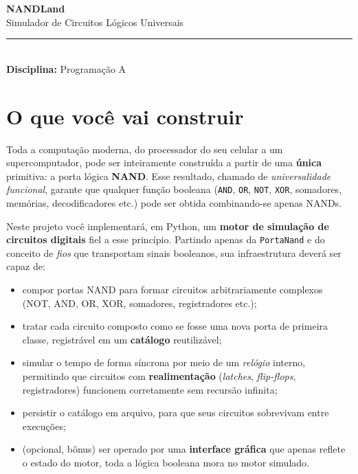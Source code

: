 \documentclass[11pt,a4paper]{article}
\begin{document}
\begin{tcolorbox}[
  enhanced, colback=nandblue!85!black, colframe=nandblue!85!black,
  arc=4pt, boxrule=0pt, left=14pt, right=14pt, top=12pt, bottom=12pt
]
\begin{center}
  {\LARGE\bfseries\color{white} NANDLand}\\[3pt]
  {\large\color{white!90} Simulador de Circuitos Lógicos Universais}\\[6pt]
  {\color{nandaccent!30}\rule{0.4\textwidth}{0.6pt}}\\[4pt]
  {\small\color{white!85}\textbf{Disciplina:} Programação A}
\end{center}
\end{tcolorbox}

\vspace{0.4cm}

\section*{O que você vai construir}

Toda a computação moderna, do processador do seu celular a um supercomputador, pode ser inteiramente construída a partir de uma \textbf{única} primitiva: a porta lógica \textbf{NAND}. Esse resultado, chamado de \emph{universalidade funcional}, garante que qualquer função booleana (\texttt{AND}, \texttt{OR}, \texttt{NOT}, \texttt{XOR}, somadores, memórias, decodificadores etc.) pode ser obtida combinando-se apenas NANDs.

Neste projeto você implementará, em Python, um \textbf{motor de simulação de circuitos digitais} fiel a esse princípio. Partindo apenas da \texttt{PortaNand} e do conceito de \emph{fios} que transportam sinais booleanos, sua infraestrutura deverá ser capaz de:
\begin{itemize}
    \item compor portas NAND para formar circuitos arbitrariamente complexos (NOT, AND, OR, XOR, somadores, registradores etc.);
    \item tratar cada circuito composto como se fosse uma nova porta de primeira classe, registrável em um \textbf{catálogo} reutilizável;
    \item simular o tempo de forma síncrona por meio de um \emph{relógio} interno, permitindo que circuitos com \textbf{realimentação} (\textit{latches}, \textit{flip-flops}, registradores) funcionem corretamente sem recursão infinita;
    \item persistir o catálogo em arquivo, para que seus circuitos sobrevivam entre execuções;
    \item (opcional, bônus) ser operado por uma \textbf{interface gráfica} que apenas reflete o estado do motor, toda a lógica booleana mora no motor simulado.
\end{itemize}
\end{document}
